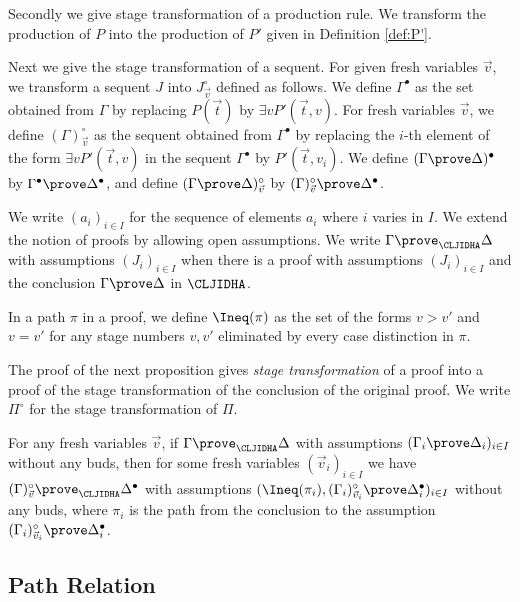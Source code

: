 Secondly 
we give stage transformation of a production rule.
We transform the production of $P$
into the production of $P'$ given in Definition \ref{def:P'}.

Next we give the stage transformation of a sequent.
For given fresh variables $\Vec v$,
we transform a sequent $J$ into $J^\circ_{\Vec v}$ defined as follows.
We define $\Gamma^\bullet$ 
as the set obtained from $\Gamma$
by replacing $P(\Vec t)$ by $\exists vP'(\Vec t,v)$.
%
For fresh variables $\Vec v$, 
we define $(\Gamma)^\circ_{\Vec v}$ 
as the sequent obtained from $\Gamma^\bullet$
by replacing the $i$-th element 
of the form $\exists vP'(\Vec t,v)$ in the sequent $\Gamma^\bullet$
by $P'(\Vec t,v_i)$.
%
We define $(\Gamma \prove \Delta)^\bullet$ by $\Gamma^\bullet \prove \Delta^\bullet$,
and define $(\Gamma \prove \Delta)^\circ_{\Vec v}$ by $(\Gamma)^\circ_{\Vec v} \prove \Delta^\bullet$.

We write $(a_i)_{i \in I}$ for the sequence of elements $a_i$ 
where $i$ varies in $I$.
We extend the notion of proofs by allowing open assumptions.
We write $\Gamma \prove_\CLJIDHA \Delta$ with assumptions $(J_i)_{i \in I}$
when there is a proof with assumptions $(J_i)_{i \in I}$ and
the conclusion $\Gamma \prove \Delta$ in $\CLJIDHA$.

\begin{Def}\rm
In a path $\pi$ in a proof,
we define $\Ineq(\pi)$ as the set of the forms
$v > v'$ and $v = v'$ for any stage numbers $v,v'$
eliminated by every case distinction in $\pi$.
\end{Def}

The proof of the next proposition gives 
{\em stage transformation}
of a proof into
a proof of the stage transformation of the conclusion of the original proof.
We write $\Pi^\circ$ for the stage transformation of $\Pi$.

\begin{Prop}\label{prop:birthtrans1}
For any fresh variables $\Vec v$, 
if $\Gamma \prove_\CLJIDHA \Delta$ with assumptions $(\Gamma_i \prove \Delta_i)_{i \in I}$
without any buds,
then
for some fresh variables $(\Vec v_i)_{i \in I}$
we have $(\Gamma)^\circ_{\Vec v} \prove_\CLJIDHA \Delta^\bullet$
with assumptions $(\Ineq(\pi_i),(\Gamma_i)^\circ_{\Vec v_i} \prove \Delta_i^\bullet)_{i \in I}$
without any buds,
where $\pi_i$ is the path from the conclusion to the assumption 
$(\Gamma_i)^\circ_{\Vec v_i} \prove \Delta_i^\bullet$.
\end{Prop}

\subsection{Path Relation}

